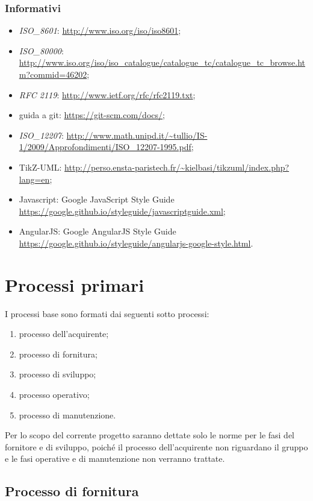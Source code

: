 \documentclass[12pt,a4paper]{article}
\begin{document}
\subsubsection{Informativi}
\begin{itemize}
	\item \textit{ISO\_8601}: \url{http://www.iso.org/iso/iso8601};
	\item \textit{ISO\_80000}: \url{http://www.iso.org/iso/iso_catalogue/catalogue_tc/catalogue_tc_browse.htm?commid=46202};
	\item \textit{RFC 2119}: {\url{http://www.ietf.org/rfc/rfc2119.txt}};
	\item guida a git: \url{https://git-scm.com/docs/};
	\item \textit{ISO\_12207}: \url{http://www.math.unipd.it/~tullio/IS-1/2009/Approfondimenti/ISO_12207-1995.pdf};
	\item TikZ-UML: \url{http://perso.ensta-paristech.fr/~kielbasi/tikzuml/index.php?lang=en};
	\item Javascript: Google JavaScript Style Guide \url{https://google.github.io/styleguide/javascriptguide.xml};
	\item AngularJS: Google AngularJS Style Guide \url{https://google.github.io/styleguide/angularjs-google-style.html}.
\end{itemize}

\newpage

\section{Processi primari}
I processi base sono formati dai seguenti sotto processi:
\begin{enumerate}
\item processo dell'acquirente;
\item processo di fornitura;
\item processo di sviluppo;
\item processo operativo;
\item processo di manutenzione.
\end{enumerate}
Per lo scopo del corrente progetto saranno dettate solo le norme per le fasi del fornitore e di sviluppo, poiché il processo dell'acquirente non riguardano il gruppo e le fasi operative e di manutenzione non verranno trattate.

\subsection{Processo di fornitura}
\end{document}
